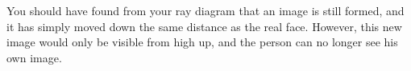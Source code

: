 You should have found from your ray diagram
that an image is still formed, and it has simply moved down the same distance
as the real face. However, this new image would only be visible from high up,
and the person can no longer see his own image. 



